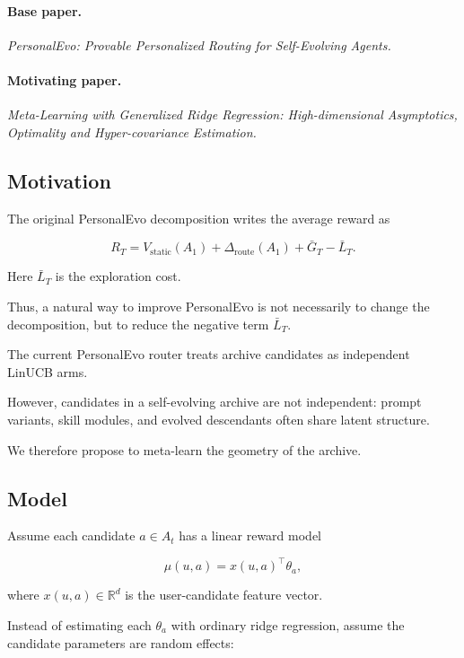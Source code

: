 \documentclass{article} %
\providecommand{\Rstatic}{V_{\mathrm{static}}}
\providecommand{\Droute}{\Delta_{\mathrm{route}}}
\begin{document}
\paragraph{Base paper.}
\emph{PersonalEvo: Provable Personalized Routing for Self-Evolving Agents.}

\paragraph{Motivating paper.}
\emph{Meta-Learning with Generalized Ridge Regression: High-dimensional
Asymptotics, Optimality and Hyper-covariance Estimation.}

\subsection{Motivation}

The original PersonalEvo decomposition writes the average reward as

\[
R_T = \Rstatic(A_1) + \Droute(A_1) + \bar{G}_T - \bar{L}_T .
\]

Here $\bar{L}_T$ is the exploration cost.

Thus, a natural way to improve
PersonalEvo is not necessarily to change the decomposition, but to reduce the
negative term $\bar{L}_T$.

The current PersonalEvo router treats archive candidates as independent LinUCB
arms.

However, candidates in a self-evolving archive are not independent:
prompt variants, skill modules, and evolved descendants often share latent
structure.

We therefore propose to meta-learn the geometry of the archive.

\begin{center}
\end{center}

\subsection{Model}

Assume each candidate $a \in A_t$ has a linear reward model

\[
\mu(u, a) = x(u, a)^\top \theta_a ,
\]

where $x(u, a) \in \mathbb{R}^d$ is the user-candidate feature vector.

Instead of estimating each $\theta_a$ with ordinary ridge regression, assume
the candidate parameters are random effects:
\end{document}
